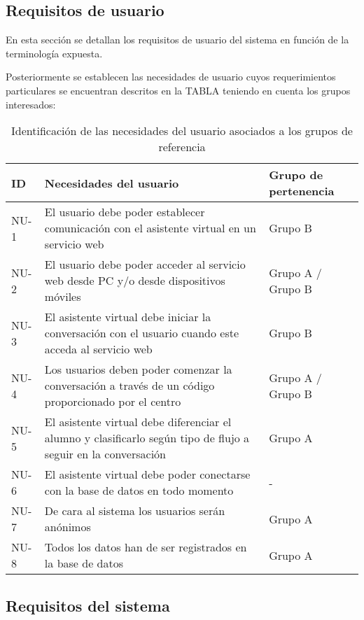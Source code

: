 \subsection{Requisitos de usuario}

En esta sección se detallan los requisitos de usuario del sistema en función de la terminología expuesta.

Posteriormente se establecen las necesidades de usuario cuyos requerimientos particulares se encuentran descritos en la TABLA teniendo en cuenta los grupos interesados:


\begin{table}[ht]
\begin{centering}
\begin{tabular}{|l|>{\centering}p{}|l|}
\hline
ID & Necesidades del usuario & Grupo de pertenencia \\ \hline
NU-1 &  El usuario debe poder establecer comunicación con el asistente virtual en un servicio web & Grupo B \\ \hline
NU-2 &  El usuario debe poder acceder al servicio web desde PC y/o desde dispositivos móviles &  Grupo A / Grupo B \\ \hline
NU-3 &  El asistente virtual debe iniciar la conversación con el usuario cuando este acceda al servicio web & Grupo B \\ \hline
NU-4 &  Los usuarios deben poder comenzar la conversación a través de un código proporcionado por el centro &  Grupo A / Grupo B \\ \hline
NU-5 & El asistente virtual debe diferenciar el alumno y clasificarlo según tipo de flujo a seguir en la conversación &  Grupo A \\ \hline
NU-6 &  El asistente virtual debe poder conectarse con la base de datos en todo momento & - \\ \hline
NU-7 & De cara al sistema los usuarios serán anónimos &  Grupo A \\ \hline
NU-8 & Todos los datos han de ser registrados en la base de datos &  Grupo A \\ \hline
\end{tabular}
\caption{Identificación de las necesidades del usuario asociados a los grupos de referencia}
\end{centering}
\end{table}



\subsection{Requisitos del sistema}

